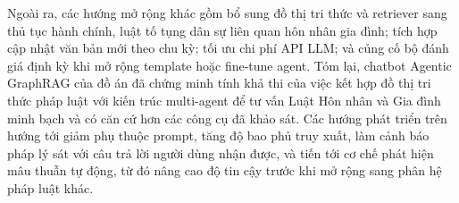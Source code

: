 \documentclass[../DoAn.tex]{subfiles}
\begin{document}
Ngoài ra, các hướng mở rộng khác gồm bổ sung đồ thị tri thức và retriever sang thủ tục hành chính, luật tố tụng dân sự liên quan hôn nhân gia đình; tích hợp cập nhật văn bản mới theo chu kỳ; tối ưu chi phí API LLM; và củng cố bộ đánh giá định kỳ khi mở rộng template hoặc fine-tune agent. Tóm lại, chatbot Agentic GraphRAG của đồ án đã chứng minh tính khả thi của việc kết hợp đồ thị tri thức pháp luật với kiến trúc multi-agent để tư vấn Luật Hôn nhân và Gia đình minh bạch và có căn cứ hơn các công cụ đã khảo sát. Các hướng phát triển trên hướng tới giảm phụ thuộc prompt, tăng độ bao phủ truy xuất, làm cảnh báo pháp lý sát với câu trả lời người dùng nhận được, và tiến tới cơ chế phát hiện mâu thuẫn tự động, từ đó nâng cao độ tin cậy trước khi mở rộng sang phân hệ pháp luật khác.
\end{document}
